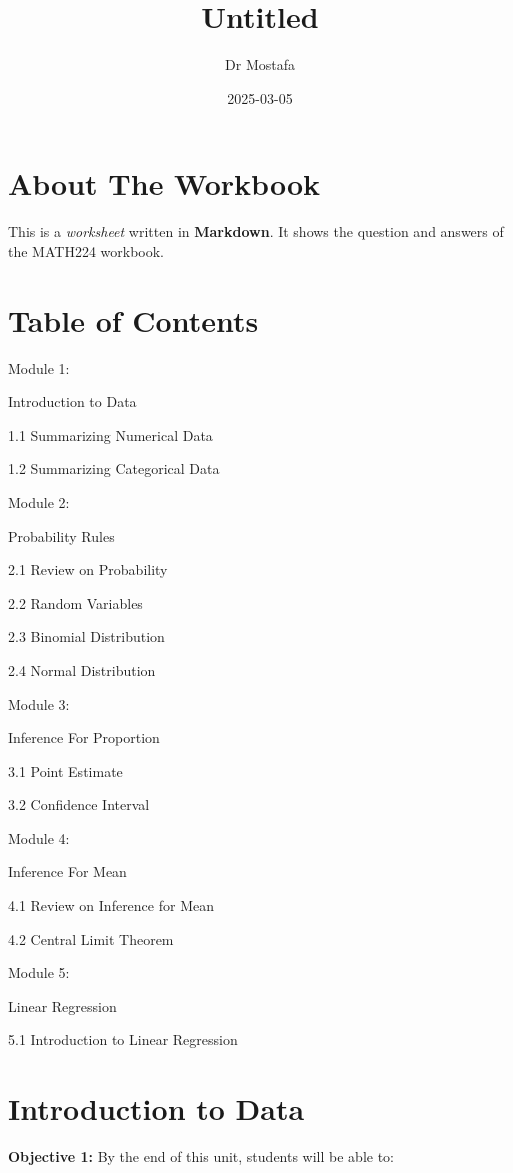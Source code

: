 \documentclass[
]{book}
\title{Untitled}
\author{Dr Mostafa}
\date{2025-03-05}
\begin{document}
\maketitle

{
\setcounter{tocdepth}{2}
\tableofcontents
}
\chapter*{About The Workbook}\label{about-the-workbook}

This is a \emph{worksheet} written in \textbf{Markdown}. It shows the question and answers of the MATH224 workbook.

\chapter*{Table of Contents}\label{table-of-contents}

\label{toc}
Module 1:

Introduction to Data

1.1 Summarizing Numerical Data

1.2 Summarizing Categorical Data

Module 2:

Probability Rules

2.1 Review on Probability

2.2 Random Variables

2.3 Binomial Distribution

2.4 Normal Distribution

Module 3:

Inference For Proportion

3.1 Point Estimate

3.2 Confidence Interval

Module 4:

Inference For Mean

4.1 Review on Inference for Mean

4.2 Central Limit Theorem

Module 5:

Linear Regression

5.1 Introduction to Linear Regression

\chapter{Introduction to Data}\label{introduction-to-data}

\textbf{Objective 1:} By the end of this unit, students will be able to:
\end{document}

